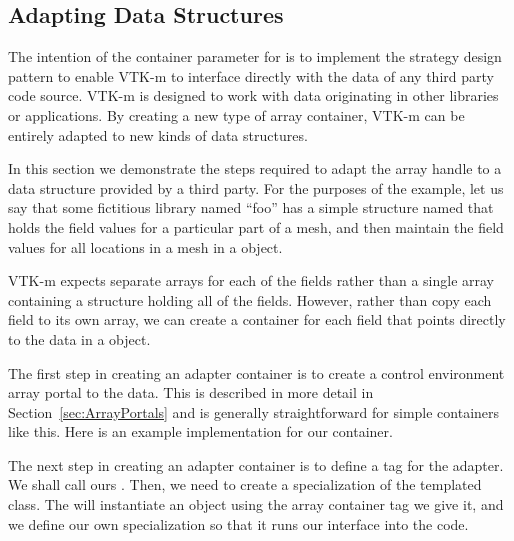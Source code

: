 \subsection{Adapting Data Structures}


The intention of the container parameter for  is to
implement the strategy design pattern to enable VTK-m to interface directly
with the data of any third party code source. VTK-m is designed to work
with data originating in other libraries or applications. By creating a new
type of array container, VTK-m can be entirely adapted to new kinds of data
structures.

In this section we demonstrate the steps required to adapt the array handle
to a data structure provided by a third party. For the purposes of the
example, let us say that some fictitious library named ``foo'' has a simple
structure named  that holds the field values for a
particular part of a mesh, and then maintain the field values for all
locations in a mesh in a  object.


VTK-m expects separate arrays for each of the fields rather than a single
array containing a structure holding all of the fields. However, rather
than copy each field to its own array, we can create a container for each
field that points directly to the data in a 
object.

The first step in creating an adapter container is to create a control
environment array portal to the data. This is described in more detail in
Section~\ref{sec:ArrayPortals} and is generally straightforward for simple
containers like this. Here is an example implementation for our
 container.


The next step in creating an adapter container is to define a tag for the
adapter. We shall call ours
. Then, we need to create a
specialization of the templated 
class. The  will instantiate an object using
the array container tag we give it, and we define our own specialization so
that it runs our interface into the code.

